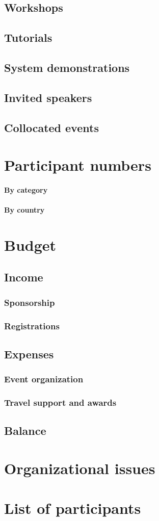 \documentclass[11pt,a4paper]{article}
\begin{document}
\subsection{Workshops}
\subsection{Tutorials}
\subsection{System demonstrations}
\subsection{Invited speakers}
\subsection{Collocated events}

\section{Participant numbers} 
\paragraph{By category}
\paragraph{By country}

\section{Budget}
\subsection{Income}
  \subsubsection{Sponsorship}
  \subsubsection{Registrations}
\subsection{Expenses}
  \subsubsection{Event organization}
  \subsubsection{Travel support and awards}
  \subsection{Balance}

\section{Organizational issues}

\section{List of participants}
\end{document}
